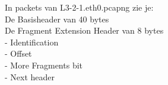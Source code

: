 In packets van L3-2-1.eth0.pcapng zie je:\\
 
De Basisheader van 40 bytes\\

De Fragment Extension Header van 8 bytes\\
- Identification\\

- Offset\\

- More Fragments bit\\

- Next header\\